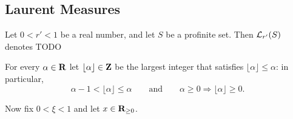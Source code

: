 \subsection{Laurent Measures}

\begin{definition}
  \label{laurent-measures}
  \leanok
  Let $0 < r' < 1$ be a real number, and let $S$ be a profinite set.
  Then $\mathcal L_{r'}(S)$ denotes TODO
\end{definition}

For every $\alpha\in\mathbf{R}$ let $\lfloor \alpha\rfloor\in\mathbf{Z}$ be the largest integer that satisfies $\lfloor \alpha\rfloor\le \alpha$: in particular,
\[
  \alpha-1 < \lfloor \alpha\rfloor\le \alpha
  \qquad\text{and}\qquad
  \alpha\geq 0 \Longrightarrow \lfloor \alpha\rfloor \geq 0.
\]

Now fix $0< \xi<1$ and let $x\in\mathbf{R}_{\geq 0}$. 


%
%


